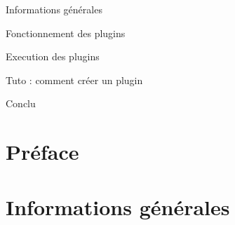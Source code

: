 \documentclass[a4paper]{report}
\begin{document}



\tableofcontents


	Informations générales

	Fonctionnement des plugins

	Execution des plugins

	Tuto : comment créer un plugin

	Conclu

\chapter*{Préface}



\chapter{Informations générales}

\end{document}
